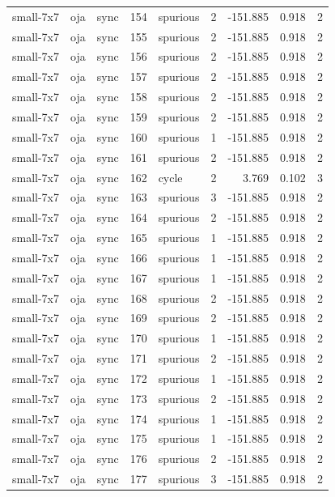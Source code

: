 \begin{tabular}{lllrlrrrr}
small-7x7 & oja & sync & 154 & spurious & 2 & -151.885 & 0.918 & 2 \\
small-7x7 & oja & sync & 155 & spurious & 2 & -151.885 & 0.918 & 2 \\
small-7x7 & oja & sync & 156 & spurious & 2 & -151.885 & 0.918 & 2 \\
small-7x7 & oja & sync & 157 & spurious & 2 & -151.885 & 0.918 & 2 \\
small-7x7 & oja & sync & 158 & spurious & 2 & -151.885 & 0.918 & 2 \\
small-7x7 & oja & sync & 159 & spurious & 2 & -151.885 & 0.918 & 2 \\
small-7x7 & oja & sync & 160 & spurious & 1 & -151.885 & 0.918 & 2 \\
small-7x7 & oja & sync & 161 & spurious & 2 & -151.885 & 0.918 & 2 \\
small-7x7 & oja & sync & 162 & cycle & 2 & 3.769 & 0.102 & 3 \\
small-7x7 & oja & sync & 163 & spurious & 3 & -151.885 & 0.918 & 2 \\
small-7x7 & oja & sync & 164 & spurious & 2 & -151.885 & 0.918 & 2 \\
small-7x7 & oja & sync & 165 & spurious & 1 & -151.885 & 0.918 & 2 \\
small-7x7 & oja & sync & 166 & spurious & 1 & -151.885 & 0.918 & 2 \\
small-7x7 & oja & sync & 167 & spurious & 1 & -151.885 & 0.918 & 2 \\
small-7x7 & oja & sync & 168 & spurious & 2 & -151.885 & 0.918 & 2 \\
small-7x7 & oja & sync & 169 & spurious & 2 & -151.885 & 0.918 & 2 \\
small-7x7 & oja & sync & 170 & spurious & 1 & -151.885 & 0.918 & 2 \\
small-7x7 & oja & sync & 171 & spurious & 2 & -151.885 & 0.918 & 2 \\
small-7x7 & oja & sync & 172 & spurious & 1 & -151.885 & 0.918 & 2 \\
small-7x7 & oja & sync & 173 & spurious & 2 & -151.885 & 0.918 & 2 \\
small-7x7 & oja & sync & 174 & spurious & 1 & -151.885 & 0.918 & 2 \\
small-7x7 & oja & sync & 175 & spurious & 1 & -151.885 & 0.918 & 2 \\
small-7x7 & oja & sync & 176 & spurious & 2 & -151.885 & 0.918 & 2 \\
small-7x7 & oja & sync & 177 & spurious & 3 & -151.885 & 0.918 & 2 \\

\end{tabular}
